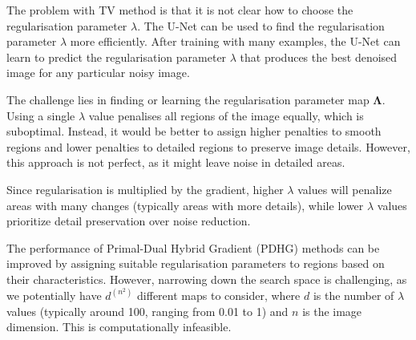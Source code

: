 \documentclass[12pt]{article}
\begin{document}




The problem with TV method is that it is not clear how to choose the regularisation parameter $\lambda$.
The U-Net can be used to find the regularisation parameter $\lambda$ more efficiently.
After training with many examples, the U-Net can learn to predict the regularisation parameter $\lambda$ that produces the best denoised image for any particular noisy image.


The challenge lies in finding or learning the regularisation parameter map $\mathbf{\Lambda}$. Using a single $\lambda$ value penalises all regions of the image equally, which is suboptimal. Instead, it would be better to assign higher penalties to smooth regions and lower penalties to detailed regions to preserve image details. However, this approach is not perfect, as it might leave noise in detailed areas.

Since regularisation is multiplied by the gradient, higher $\lambda$ values will penalize areas with many changes (typically areas with more details), while lower $\lambda$ values prioritize detail preservation over noise reduction.

The performance of Primal-Dual Hybrid Gradient (PDHG) methods can be improved by assigning suitable regularisation parameters to regions based on their characteristics. However, narrowing down the search space is challenging, as we potentially have $d^{(n^2)}$ different maps to consider, where $d$ is the number of $\lambda$ values (typically around 100, ranging from 0.01 to 1) and $n$ is the image dimension. This is computationally infeasible.
\end{document}
